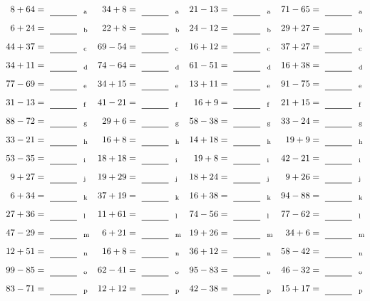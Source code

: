 \documentclass
[
  draft    = true,
  fontsize = 11pt,
  parskip  = half-
]
{scrartcl}
\begin{document}
\clearpage
\begin{align*}
    \pline{8+64}&=\rline{a}
  & \pline{34+8}&=\rline{a}
  & \pline{21-13}&=\rline{a}
  & \pline{71-65}&=\rline{a} \\[1ex]
    \pline{6+24}&=\rline{b}
  & \pline{22+8}&=\rline{b}
  & \pline{24-12}&=\rline{b}
  & \pline{29+27}&=\rline{b} \\[1ex]
    \pline{44+37}&=\rline{c}
  & \pline{69-54}&=\rline{c}
  & \pline{16+12}&=\rline{c}
  & \pline{37+27}&=\rline{c} \\[1ex]
    \pline{34+11}&=\rline{d}
  & \pline{74-64}&=\rline{d}
  & \pline{61-51}&=\rline{d}
  & \pline{16+38}&=\rline{d} \\[1ex]
    \pline{77-69}&=\rline{e}
  & \pline{34+15}&=\rline{e}
  & \pline{13+11}&=\rline{e}
  & \pline{91-75}&=\rline{e} \\[1ex]
    \pline{31-13}&=\rline{f}
  & \pline{41-21}&=\rline{f}
  & \pline{16+9}&=\rline{f}
  & \pline{21+15}&=\rline{f} \\[1ex]
    \pline{88-72}&=\rline{g}
  & \pline{29+6}&=\rline{g}
  & \pline{58-38}&=\rline{g}
  & \pline{33-24}&=\rline{g} \\[1ex]
    \pline{33-21}&=\rline{h}
  & \pline{16+8}&=\rline{h}
  & \pline{14+18}&=\rline{h}
  & \pline{19+9}&=\rline{h} \\[1ex]
    \pline{53-35}&=\rline{i}
  & \pline{18+18}&=\rline{i}
  & \pline{19+8}&=\rline{i}
  & \pline{42-21}&=\rline{i} \\[1ex]
    \pline{9+27}&=\rline{j}
  & \pline{19+29}&=\rline{j}
  & \pline{18+24}&=\rline{j}
  & \pline{9+26}&=\rline{j} \\[1ex]
    \pline{6+34}&=\rline{k}
  & \pline{37+19}&=\rline{k}
  & \pline{16+38}&=\rline{k}
  & \pline{94-88}&=\rline{k} \\[1ex]
    \pline{27+36}&=\rline{l}
  & \pline{11+61}&=\rline{l}
  & \pline{74-56}&=\rline{l}
  & \pline{77-62}&=\rline{l} \\[1ex]
    \pline{47-29}&=\rline{m}
  & \pline{6+21}&=\rline{m}
  & \pline{19+26}&=\rline{m}
  & \pline{34+6}&=\rline{m} \\[1ex]
    \pline{12+51}&=\rline{n}
  & \pline{16+8}&=\rline{n}
  & \pline{36+12}&=\rline{n}
  & \pline{58-42}&=\rline{n} \\[1ex]
    \pline{99-85}&=\rline{o}
  & \pline{62-41}&=\rline{o}
  & \pline{95-83}&=\rline{o}
  & \pline{46-32}&=\rline{o} \\[1ex]
    \pline{83-71}&=\rline{p}
  & \pline{12+12}&=\rline{p}
  & \pline{42-38}&=\rline{p}
  & \pline{15+17}&=\rline{p}
\end{align*}
\end{document}
